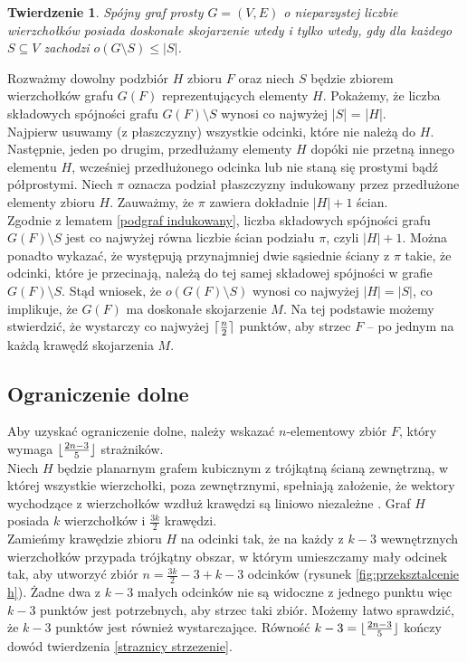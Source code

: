 \documentclass[brudnopis]{xmgr}
\DeclarePairedDelimiter\ceil{\lceil}{\rceil}
\DeclarePairedDelimiter\floor{\lfloor}{\rfloor}
\newtheorem{Twierdzenie}{Twierdzenie}
\theoremstyle{definition}
\begin{document}
\begin{Twierdzenie} \cite{tutte}
	Spójny graf prosty $G=(V,E)$ o nieparzystej liczbie wierzchołków posiada doskonałe skojarzenie wtedy i tylko wtedy, gdy dla każdego $S \subseteq V$ zachodzi $o(G \setminus S) \le |S|$.
\end{Twierdzenie}

Rozważmy dowolny podzbiór $H$ zbioru $F$ oraz niech $S$ będzie zbiorem wierzchołków grafu $G(F)$ reprezentujących elementy $H$. Pokażemy, że liczba składowych spójności grafu $G(F) \setminus S$ wynosi co najwyżej |$S$| = |$H$|.
\\\indent Najpierw usuwamy (z płaszczyzny) wszystkie odcinki, które nie należą do $H$. Następnie, jeden po drugim, przedłużamy elementy $H$ dopóki nie przetną innego elementu $H$, wcześniej przedłużonego odcinka lub nie staną się prostymi bądź półprostymi. Niech $\pi$ oznacza podział płaszczyzny indukowany przez przedłużone elementy zbioru $H$. Zauważmy, że $\pi$ zawiera dokładnie $|H| + 1$ ścian. 
\\\indent Zgodnie z lematem \ref{podgraf indukowany}, liczba składowych spójności grafu $G(F) \setminus S$ jest co najwyżej równa liczbie ścian podziału $\pi$, czyli $|H| + 1$. Można ponadto wykazać, że występują przynajmniej dwie sąsiednie ściany z $\pi$ takie, że odcinki, które je przecinają, należą do tej samej składowej spójności w grafie $G(F) \setminus S$. Stąd wniosek, że $o (G(F) \setminus S)$ wynosi co najwyżej $|H| = |S|$, co implikuje, że $G(F)$ ma doskonałe skojarzenie $M$. Na tej podstawie możemy stwierdzić, że wystarczy co najwyżej $\ceil{\frac{n}{2}}$ punktów, aby strzec $F$ -- po jednym na każdą krawędź skojarzenia $M$. 
\subsection{Ograniczenie dolne}
\indent Aby uzyskać ograniczenie dolne, należy wskazać $n$-elementowy zbiór $F$, który wymaga $\floor{\frac{2n-3}{5}}$ strażników.
\\\indent Niech $H$ będzie planarnym grafem kubicznym z trójkątną ścianą zewnętrzną, w której wszystkie wierzchołki, poza zewnętrznymi, spełniają założenie, że wektory wychodzące z wierzchołków wzdłuż krawędzi są liniowo niezależne \cite{topp}. Graf $H$ posiada $k$ wierzchołków i $\frac{3k}{2}$ krawędzi.
\\\indent Zamieńmy krawędzie zbioru $H$ na odcinki tak, że na każdy z $k - 3$ wewnętrznych wierzchołków przypada trójkątny obszar, w którym umieszczamy mały odcinek tak, aby utworzyć zbiór $n = \frac{3k}{2} - 3 + k  - 3$ odcinków (rysunek \ref{fig:przeksztalcenie h}). Żadne dwa z $k - 3$ małych odcinków nie są widoczne z jednego punktu więc $k - 3$ punktów jest potrzebnych, aby strzec taki zbiór. Możemy łatwo sprawdzić, że $k - 3$ punktów jest również wystarczające. Równość $k - 3 = \floor{\frac{2n - 3}{5}}$ kończy dowód twierdzenia \ref{straznicy strzezenie}.
\end{document}
